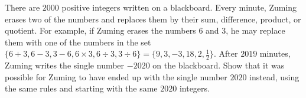 There are $2000$ positive integers written on a blackboard. Every minute, Zuming erases two of the numbers and replaces them by their sum, difference, product, or quotient. For example, if Zuming erases the numbers $6$ and $3$, he may replace them with one of the numbers in the set $\{6+3,6-3,3-6,6\times3,6\div3,3\div6\}=\{9,3,-3,18,2,\frac{1}{2}\}$. After $2019$ minutes, Zuming writes the single number $-2020$ on the blackboard. Show that it was possible for Zuming to have ended up with the single number $2020$ instead, using the same rules and starting with the same $2020$ integers.
